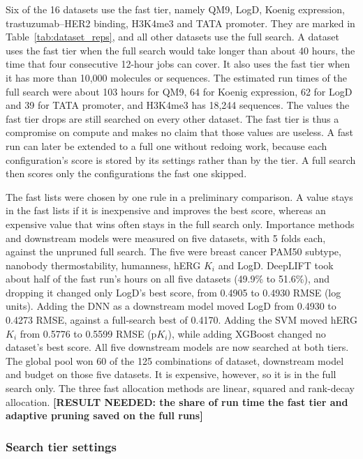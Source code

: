 Six of the 16 datasets use the fast tier, namely QM9, LogD, Koenig expression, trastuzumab--HER2 binding, H3K4me3 and TATA promoter. They are marked in Table~\ref{tab:dataset_reps}, and all other datasets use the full search. A dataset uses the fast tier when the full search would take longer than about 40 hours, the time that four consecutive 12-hour jobs can cover. It also uses the fast tier when it has more than 10,000 molecules or sequences. The estimated run times of the full search were about 103 hours for QM9, 64 for Koenig expression, 62 for LogD and 39 for TATA promoter, and H3K4me3 has 18,244 sequences. The values the fast tier drops are still searched on every other dataset. The fast tier is thus a compromise on compute and makes no claim that those values are useless. A fast run can later be extended to a full one without redoing work, because each configuration's score is stored by its settings rather than by the tier. A full search then scores only the configurations the fast one skipped.

The fast lists were chosen by one rule in a preliminary comparison. A value stays in the fast lists if it is inexpensive and improves the best score, whereas an expensive value that wins often stays in the full search only. Importance methods and downstream models were measured on five datasets, with 5 folds each, against the unpruned full search. The five were breast cancer PAM50 subtype, nanobody thermostability, humanness, hERG $K_i$ and LogD. DeepLIFT took about half of the fast run's hours on all five datasets (49.9\% to 51.6\%), and dropping it changed only LogD's best score, from 0.4905 to 0.4930 RMSE (log units). Adding the DNN as a downstream model moved LogD from 0.4930 to 0.4273 RMSE, against a full-search best of 0.4170. Adding the SVM moved hERG $K_i$ from 0.5776 to 0.5599 RMSE (p$K_i$), while adding XGBoost changed no dataset's best score. All five downstream models are now searched at both tiers. The global pool won 60 of the 125 combinations of dataset, downstream model and budget on those five datasets. It is expensive, however, so it is in the full search only. The three fast allocation methods are linear, squared and rank-decay allocation. \textbf{[RESULT NEEDED: the share of run time the fast tier and adaptive pruning saved on the full runs]}

\subsubsection{Search tier settings}

